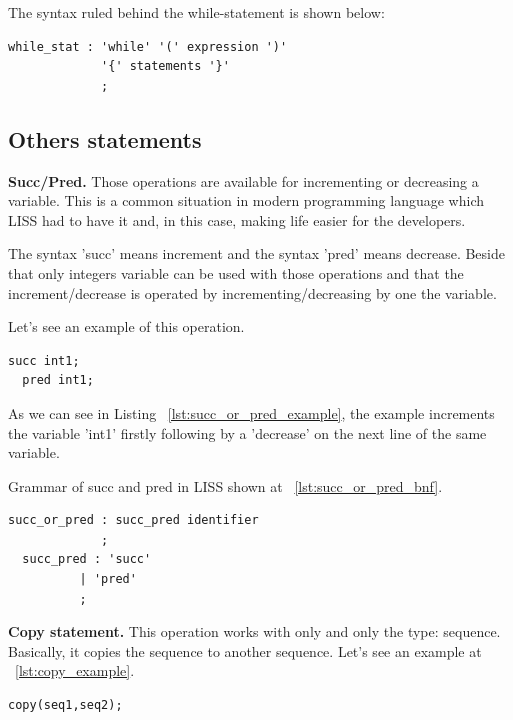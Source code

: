 \documentclass[
  oneside,
  11pt, a4paper,
  footinclude=true,
  headinclude=true,
  cleardoublepage=empty
]{scrbook}
\begin{document}
The syntax ruled behind the while-statement is shown below:

\begin{lstlisting}[caption={BNF of while-statement in LISS}]
  while_stat : 'while' '(' expression ')'
             '{' statements '}'
             ;
\end{lstlisting}



\subsection{Others statements}

\textbf{Succ/Pred.} Those operations are available for incrementing or decreasing a variable. This is a common situation in modern programming language which LISS had to have it and, in this case, making life easier for the developers. 

The syntax 'succ' means increment and the syntax 'pred' means decrease. Beside that only integers variable can be used with those operations and that the increment/decrease is operated by incrementing/decreasing by one the variable. 

Let's see an example of this operation.

\begin{lstlisting}[caption={Example of using succ/pred in LISS}, label={lst:succ_or_pred_example}]
  succ int1;
  pred int1;
\end{lstlisting}

As we can see in Listing ~\ref{lst:succ_or_pred_example}, the example increments the variable 'int1' firstly following by a 'decrease' on the next line of the same variable.

Grammar of succ and pred in LISS shown at ~\ref{lst:succ_or_pred_bnf}.


\begin{lstlisting}[caption={BNF of succ and pred in LISS}, label={lst:succ_or_pred_bnf}]
  succ_or_pred : succ_pred identifier
             ;
  succ_pred : 'succ'
          | 'pred'
          ;
\end{lstlisting}

\textbf{Copy statement.}
This operation works with only and only the type: sequence.
Basically, it copies the sequence to another sequence.
Let's see an example at ~\ref{lst:copy_example}.

\begin{lstlisting}[caption={Example of copy statement in LISS},label={lst:copy_example}]
  copy(seq1,seq2);
\end{lstlisting}
\end{document}
